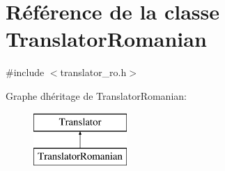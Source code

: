 \hypertarget{class_translator_romanian}{}\section{Référence de la classe Translator\+Romanian}
\label{class_translator_romanian}


{\ttfamily \#include $<$translator\+\_\+ro.\+h$>$}

Graphe d\textquotesingle{}héritage de Translator\+Romanian\+:\begin{figure}[H]
\begin{center}
\leavevmode
\includegraphics[height=2.000000cm]{class_translator_romanian}
\end{center}
\end{figure}
